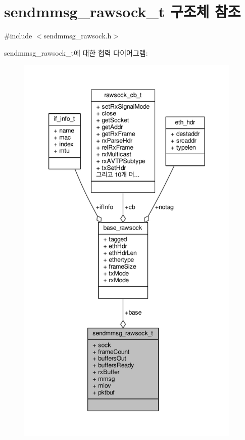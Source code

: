 \hypertarget{structsendmmsg__rawsock__t}{}\section{sendmmsg\+\_\+rawsock\+\_\+t 구조체 참조}
\label{structsendmmsg__rawsock__t}


{\ttfamily \#include $<$sendmmsg\+\_\+rawsock.\+h$>$}



sendmmsg\+\_\+rawsock\+\_\+t에 대한 협력 다이어그램\+:
\nopagebreak
\begin{figure}[H]
\begin{center}
\leavevmode
\includegraphics[height=550pt]{structsendmmsg__rawsock__t__coll__graph}
\end{center}
\end{figure}
